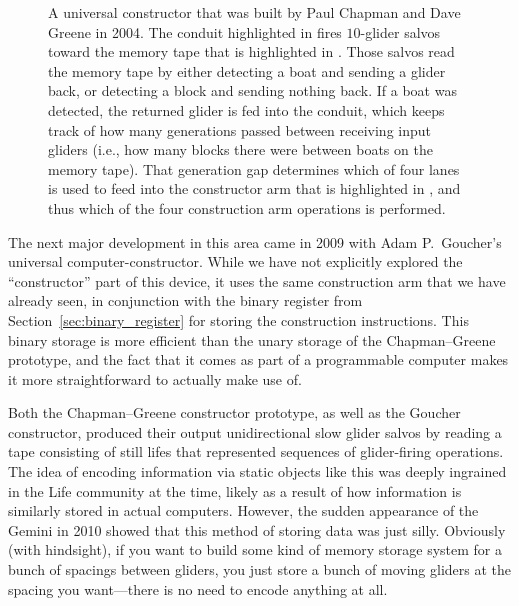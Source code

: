 \begin{figure}[!htbp]
	\centering
	\caption{A universal constructor that was built by Paul Chapman and Dave Greene in 2004. The conduit highlighted in  fires $10$-glider salvos toward the memory tape that is highlighted in . Those salvos read the memory tape by either detecting a boat and sending a glider back, or detecting a block and sending nothing back. If a boat was detected, the returned glider is fed into the  conduit, which keeps track of how many generations passed between receiving input gliders (i.e., how many blocks there were between boats on the memory tape). That generation gap determines which of four lanes is used to feed into the constructor arm that is highlighted in , and thus which of the four construction arm operations is performed.}\label{fig:chapman_greene_constructor}
\end{figure}

The next major development in this area came in 2009 with Adam P.~Goucher's universal computer-constructor. While we have not explicitly explored the ``constructor'' part of this device, it uses the same construction arm that we have already seen, in conjunction with the binary register from Section~\ref{sec:binary_register} for storing the construction instructions. This binary storage is more efficient than the unary storage of the Chapman--Greene prototype, and the fact that it comes as part of a programmable computer makes it more straightforward to actually make use of.

Both the Chapman--Greene constructor prototype, as well as the Goucher constructor, produced their output unidirectional slow glider salvos by reading a tape consisting of still lifes that represented sequences of glider-firing operations. The idea of encoding information via static objects like this was deeply ingrained in the Life community at the time, likely as a result of how information is similarly stored in actual computers. However, the sudden appearance of the Gemini in 2010 showed that this method of storing data was just silly. Obviously (with hindsight), if you want to build some kind of memory storage system for a bunch of spacings between gliders, you just store a bunch of moving gliders at the spacing you want---there is no need to encode anything at all.

